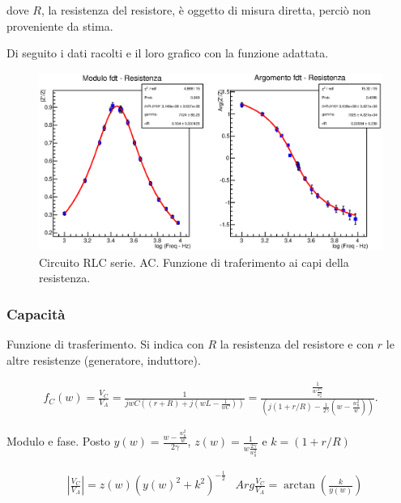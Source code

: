 dove $R$, la resistenza del resistore, è oggetto di misura diretta, perciò non proveniente da stima. 

Di seguito i dati racolti e il loro grafico con la funzione adattata.




\begin{figure}[H]
\centering
\includegraphics[scale=0.75]{Grafici/C4_P2_Res.eps}
\caption{
Circuito RLC serie.
AC.
Funzione di traferimento ai capi della resistenza.
}
\label{fig:C4_P2_Res}
\end{figure}











\subsubsection{Capacità}

Funzione di trasferimento.
Si indica con $R$ la resistenza del resistore e con $r$ le altre resistenze (generatore, induttore).

\begin{align*}
f_{C}(w) = \frac{V_{C}}{V_{A}} 
= \frac{1}{ jwC ( (r+R) + j(wL - \frac{1}{wC}) ) }
= 
\frac{\frac{1}{w\frac{2\gamma}{w_0^2}}}
{( j(1+r/R) - \frac{1}{2\gamma}( w-\frac{w_0^2}{w} ) ) }.
\end{align*}

Modulo e fase.
Posto
$ y(w) = \frac{w - \frac{w_0^2}{w}}{2\gamma} $,
$ z(w) = \frac{1}{w\frac{2\gamma}{w_0^2}} $ e 
$ k = (1+r/R)$

\begin{align*}
& |\frac{V_{C}}{V_{A}}|  = z(w)( y(w)^2 + k^2)^{-\frac{1}{2}}
& Arg\frac{V_{C}}{V_{A}} = \arctan( \frac{k}{y(w)} )
\end{align*}


